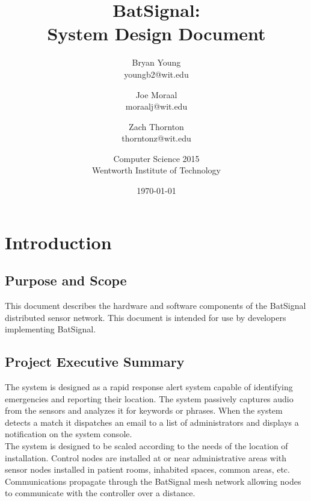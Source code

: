 \documentclass[11pt,a4paper]{article}
\begin{document}
\title{BatSignal:\\System Design Document}
\author{
	Bryan Young\\youngb2@wit.edu \and
	Joe Moraal\\moraalj@wit.edu\\ \and
	Zach Thornton\\thorntonz@wit.edu \and
	Computer Science 2015 \\
	Wentworth Institute of Technology
}
\date{\today}

\maketitle
\newpage

\tableofcontents{}
\newpage


\section{Introduction}

\subsection{Purpose and Scope}
\textnormal{This document describes the hardware and software components of the BatSignal distributed sensor network. This document is intended for use by developers implementing BatSignal.}

\subsection{Project Executive Summary}
\textnormal{The system is designed as a rapid response alert system capable of identifying emergencies and reporting their location. The system passively captures audio from the sensors and analyzes it for keywords or phrases. When the system detects a match it dispatches an email to a list of administrators and displays a notification on the system console. \\
The system is designed to be scaled according to the needs of the location of installation. Control nodes are installed at or near administrative areas with sensor nodes installed in patient rooms, inhabited spaces, common areas, etc. Communications propagate through the BatSignal mesh network allowing nodes to communicate with the controller over a distance.}
\end{document}
